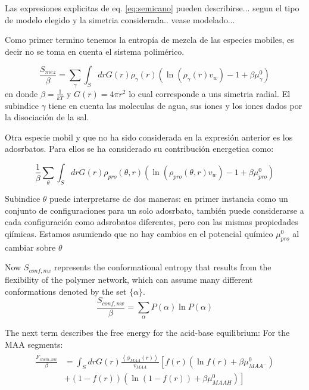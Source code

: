 Las expresiones explicitas de eq. \ref{eq:semicano} pueden describirse... segun el tipo de modelo elegido y la simetria considerada.. vease modelado...

Como primer termino tenemos la entrop\'ia de mezcla de  las especies mobiles, es decir no se toma en cuenta el sistema polim\'erico.

\begin{equation}
   \frac{S_{mez}}{\beta}= \sum_{\gamma}\int_S{dr G(r)\rho_\gamma(r)\left(\ln \left(\rho_\gamma (r)v_w\right) -1 + \beta\mu^0_\gamma\right)}
\end{equation}
\noindent en donde $\beta = \frac{1}{kT}$ y $G(r) = 4\pi r^2$ lo cual corresponde a uns simetria radial. El subindice $\gamma$ tiene en cuenta las moleculas de agua, sus iones y los iones dados por la disociaci\'on de la sal.

Otra especie mobil y que no ha sido considerada en la expresi\'on anterior es los adosrbatos. Para ellos se ha considerado su contribuci\'on energetica como:

\begin{equation}
    \frac{1}{\beta}\sum_{\theta}\int_S{dr G(r)\rho_{pro}(\theta,r)\left(\ln \left(\rho_{pro}(\theta,r)v_w\right) -1 + \beta\mu^0_{pro} \right)}
\end{equation}

Subindice $\theta$ puede interpretarse de dos maneras: en primer instancia como un conjunto de configuraciones para un solo adosrbato, tambi\'en puede considerarse a cada configuraci\'on como adsrobatos diferentes, pero con las mismas propiedades qi\'imicas.
Estamos asumiendo que no hay cambios en el potencial qu\'imico  $\mu^0_{pro}$ al cambiar sobre $\theta$ 

Now $S_{conf,nw}$ represents the conformational entropy that results from the flexibility of the polymer network, which can assume many different conformations denoted by the set $\{\alpha\}$. 
\begin{equation}
    \frac{S_{conf,nw}}{\beta} = \sum_{\alpha}{P(\alpha)\ln P(\alpha)}
\end{equation}

The next term describes the free energy for the acid-base equilibrium:
For the MAA segments:
\begin{align}
\begin{aligned}
\frac{F_{chem,nw}}{\beta} &= \int_S drG(r) \frac{\left<\phi_{MAA}(r)\right>}{v_{MAA}} \left[f(r)(\ln f(r)+ \beta\mu^0_{MAA^-})\right.\\
&\left.+(1-f(r))(\ln (1-f(r))+\beta\mu^0_{MAAH})\right]    
\end{aligned}
\end{align} 

